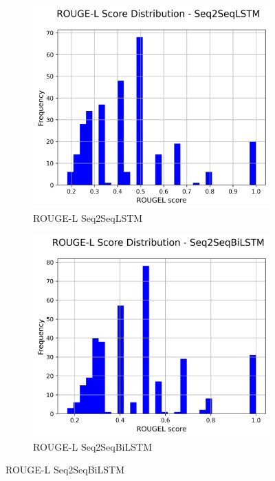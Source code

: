 \documentclass[a4paper, 12pt]{article}
\begin{document}
\begin{figure}[H]
    \begin{subfigure}{0.32\textwidth}
        \centering
        \includegraphics[width=\textwidth]{media/Seq2SeqLSTM_rougeL_scores.png}
        \caption{ROUGE-L Seq2SeqLSTM}
    \end{subfigure}
    \hfill
    \begin{subfigure}{0.32\textwidth}
        \centering
        \includegraphics[width=\textwidth]{media/Seq2SeqBiLSTM_rougeL_scores.png}
        \caption{ROUGE-L Seq2SeqBiLSTM}

\end{subfigure}
\end{figure}
\end{document}
